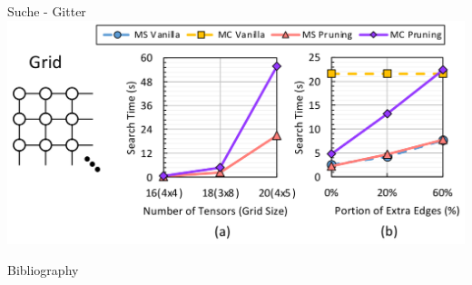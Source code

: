 \documentclass{beamer}
\begin{document}
\begin{frame}{Suche - Gitter}
	\includegraphics[scale=0.2]{figure-11}
\end{frame}
\note[itemize]{
	\item
}


\begin{frame}[allowframebreaks]{Bibliography}
	
	
	\nocite{*}
\end{frame}
\end{document}
